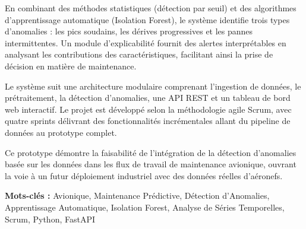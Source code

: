 En combinant des méthodes statistiques (détection par seuil) et des algorithmes d'apprentissage automatique (Isolation Forest), le système identifie trois types d'anomalies : les pics soudains, les dérives progressives et les pannes intermittentes. Un module d'explicabilité fournit des alertes interprétables en analysant les contributions des caractéristiques, facilitant ainsi la prise de décision en matière de maintenance.

Le système suit une architecture modulaire comprenant l'ingestion de données, le prétraitement, la détection d'anomalies, une API REST et un tableau de bord web interactif. Le projet est développé selon la méthodologie agile Scrum, avec quatre sprints délivrant des fonctionnalités incrémentales allant du pipeline de données au prototype complet.

Ce prototype démontre la faisabilité de l'intégration de la détection d'anomalies basée sur les données dans les flux de travail de maintenance avionique, ouvrant la voie à un futur déploiement industriel avec des données réelles d'aéronefs.

\textbf{Mots-clés :} Avionique, Maintenance Prédictive, Détection d'Anomalies, Apprentissage Automatique, Isolation Forest, Analyse de Séries Temporelles, Scrum, Python, FastAPI
